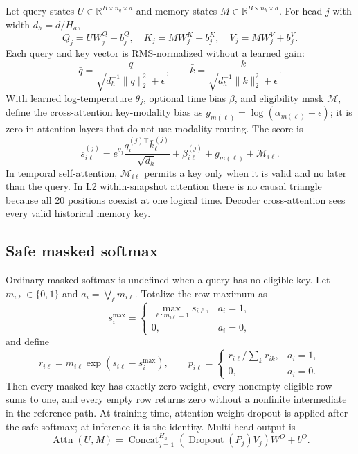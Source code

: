 \documentclass[10pt,letterpaper]{article}
\numberwithin{equation}{section}
\newcommand{\R}{\mathbb{R}}
\newcommand{\Attn}{\operatorname{Attn}}
\theoremstyle{definition}
\theoremstyle{remark}
\begin{document}
Let query states $U\in\R^{B\times n_q\times d}$ and memory states
$M\in\R^{B\times n_k\times d}$. For head $j$ with width $d_h=d/H_a$,
\begin{equation}
Q_j=UW_j^Q+b_j^Q,\quad
K_j=MW_j^K+b_j^K,\quad
V_j=MW_j^V+b_j^V.
\label{eq:qkv}
\end{equation}
Each query and key vector is RMS-normalized without a learned gain:
\begin{equation}
\bar q=\frac{q}{\sqrt{d_h^{-1}\lVert q\rVert_2^2+\epsilon}},
\qquad
\bar k=\frac{k}{\sqrt{d_h^{-1}\lVert k\rVert_2^2+\epsilon}}.
\label{eq:qk-normalization}
\end{equation}
With learned log-temperature $\theta_j$, optional time bias $\beta$, and
eligibility mask $\mathcal M$, define the cross-attention key-modality bias as
\(g_{m(\ell)}=\log(\alpha_{m(\ell)}+\epsilon)\); it is zero in attention
layers that do not use modality routing. The score is
\begin{equation}
s_{i\ell}^{(j)}=
e^{\theta_j}\frac{\bar q_i^{(j)\top}\bar k_\ell^{(j)}}{\sqrt{d_h}}
+\beta_{i\ell}^{(j)}
+g_{m(\ell)}+\mathcal M_{i\ell}.
\label{eq:attention-score}
\end{equation}
In temporal self-attention, $\mathcal M_{i\ell}$ permits a key only when it is
valid and no later than the query. In L2 within-snapshot attention there is no
causal triangle because all 20 positions coexist at one logical time. Decoder
cross-attention sees every valid historical memory key.

\subsection{Safe masked softmax}

Ordinary masked softmax is undefined when a query has no eligible key. Let
$m_{i\ell}\in\{0,1\}$ and $a_i=\bigvee_\ell m_{i\ell}$. Totalize the row
maximum as
\begin{equation}
s_i^{\max}=
\begin{cases}
\max_{\ell:m_{i\ell}=1}s_{i\ell},&a_i=1,\\
0,&a_i=0,
\end{cases}
\label{eq:safe-row-maximum}
\end{equation}
and define
\begin{equation}
r_{i\ell}=m_{i\ell}\exp(s_{i\ell}-s_i^{\max}),\qquad
p_{i\ell}=
\begin{cases}
r_{i\ell}/\sum_k r_{ik},&a_i=1,\\
0,&a_i=0.
\end{cases}
\label{eq:safe-softmax}
\end{equation}
Then every masked key has exactly zero weight, every nonempty eligible row sums
to one, and every empty row returns zero without a nonfinite intermediate in
the reference path. At training time, attention-weight dropout is applied after
the safe softmax; at inference it is the identity. Multi-head output is
\begin{equation}
\Attn(U,M)=\operatorname{Concat}_{j=1}^{H_a}
(\operatorname{Dropout}(P_j)V_j)W^O+b^O.
\label{eq:attention-output}
\end{equation}
\end{document}

